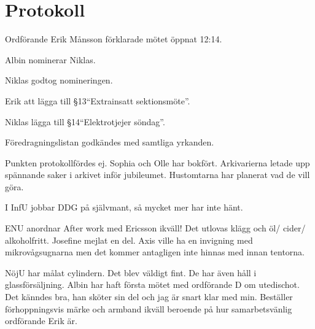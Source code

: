 \documentclass[10pt]{article}
\def\mo{Erik Månsson}
\begin{document}
\section*{Protokoll}
\begin{paragrafer}
Ordförande {\mo} förklarade mötet öppnat 12:14.

{\valavmo}

{\valavms}

Albin nominerar Niklas.

Niklas godtog nomineringen.

{\valavj}

{\tosg}


{\ingaadj}

\newpage
{}
Erik \ypa att lägga till \S13``Extrainsatt sektionsmöte''.

Niklas \ypa lägga till \S14``Elektrotjejer söndag''.

Föredragningslistan godkändes med samtliga yrkanden.


\begin{fyllnadsval} %
\end{fyllnadsval}

\begin{paragrafer}
Punkten protokollfördes ej.
Sophia och Olle har bokfört. Arkivarierna letade upp spännande saker i arkivet inför jubileumet. Hustomtarna har planerat vad de vill göra.

I InfU jobbar DDG på självmant, så mycket mer har inte hänt.

ENU anordnar After work med Ericsson ikväll! Det utlovas klägg och öl/ cider/ alkoholfritt. Josefine mejlat en del. Axis ville ha en invigning med mikrovågsugnarna men det kommer antagligen inte hinnas med innan tentorna.

NöjU har målat cylindern. Det blev väldigt fint. De har även håll i glassförsäljning. Albin har haft första mötet med ordförande D om utedischot. Det känndes bra, han sköter sin del och jag är snart klar med min. Beställer förhoppningsvis märke och armband ikväll beroende på hur samarbetsvänlig ordförande Erik är.


\end{paragrafer}
\end{paragrafer}
\end{document}

